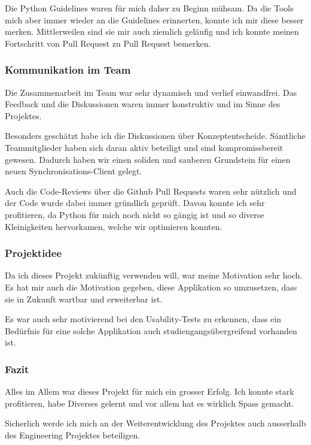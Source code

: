 \documentclass[a4paper]{article}
\begin{document}
Die Python Guidelines waren für mich daher zu Beginn mühsam.
Da die Tools mich aber immer wieder an die Guidelines erinnerten, konnte ich mir diese besser merken.
Mittlerweilen sind sie mir auch ziemlich geläufig und ich konnte meinen Fortschritt von Pull Request zu Pull Request bemerken.

\subsubsection{Kommunikation im Team}

Die Zusammenarbeit im Team war sehr dynamisch und verlief einwandfrei.
Das Feedback und die Diskussionen waren immer konstruktiv und im Sinne des Projektes.

Besonders geschätzt habe ich die Diskussionen über Konzeptentscheide.
Sämtliche Teammitglieder haben sich daran aktiv beteiligt und sind kompromissbereit gewesen.
Dadurch haben wir einen soliden und sauberen Grundstein für einen neuen Synchronisations-Client gelegt.

Auch die Code-Reviews über die Github Pull Requests waren sehr nützlich und der Code wurde dabei immer gründlich geprüft.
Davon konnte ich sehr profitieren, da Python für mich noch nicht so gängig ist und so diverse Kleinigkeiten hervorkamen, welche wir optimieren konnten.

\subsubsection{Projektidee}

Da ich dieses Projekt zukünftig verwenden will, war meine Motivation sehr hoch.
Es hat mir auch die Motivation gegeben, diese Applikation so umzusetzen, dass sie in Zukunft wartbar und erweiterbar ist.

Es war auch sehr motivierend bei den Usability-Tests zu erkennen, dass ein Bedürfnis für eine solche Applikation auch studiengangsübergreifend vorhanden ist.

\subsubsection{Fazit}

Alles im Allem war dieses Projekt für mich ein grosser Erfolg.
Ich konnte stark profitieren, habe Diverses gelernt und vor allem hat es wirklich Spass gemacht.

Sicherlich werde ich mich an der Weiterentwicklung des Projektes auch ausserhalb des Engineering Projektes beteiligen.
\end{document}
